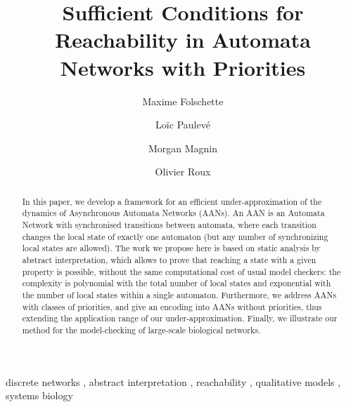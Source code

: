 \documentclass{elsarticle}
\begin{document}
\begin{frontmatter}
\title{Sufficient Conditions for Reachability in Automata Networks with Priorities}

\author[irccyn,unikassel]{Maxime Folschette}
\author[lri]{Loïc Paulevé}
\author[irccyn]{Morgan Magnin}
\author[irccyn]{Olivier Roux}

\address[irccyn]{LUNAM Universit\'e, \'Ecole Centrale de Nantes, IRCCyN UMR CNRS 6597\\
(Institut de Recherche en Communications et Cybern\'etique de Nantes)\\
1 rue de la No\"e - B.P. 92101 - 44321 Nantes Cedex 3, France.}

\address[unikassel]{School of Electrical Engineering and Computer Science,\\
  University of Kassel, Germany}

\address[lri]{CNRS, Laboratoire de Recherche en Informatique (LRI)\\
		Université Paris-Sud - CNRS UMR 8623, France}


\begin{abstract}
In this paper,
we develop a framework for an efficient under-approximation of the dynamics of
Asynchronous Automata Networks (AANs).
An AAN is an Automata Network with synchronised transitions between automata,
where each transition changes the local state of exactly one automaton
(but any number of synchronizing local states are allowed).
The work we propose here
is based on static analysis by abstract interpretation,
which allows to prove that reaching a state with a given property
is possible,
without the same computational cost of usual model checkers:
the complexity is polynomial with the total number of local states and exponential with the number of
local states within a single automaton.
Furthermore, we address AANs with classes of priorities,
and give an encoding into AANs without priorities,
thus extending the application range of our under-approximation.
Finally, we illustrate our method for the model-checking of
large-scale biological networks.
\end{abstract}
\begin{keyword}
discrete networks \sep
abstract interpretation \sep
reachability \sep
qualitative models \sep
systems biology
\end{keyword}
\end{frontmatter}




\end{document}
